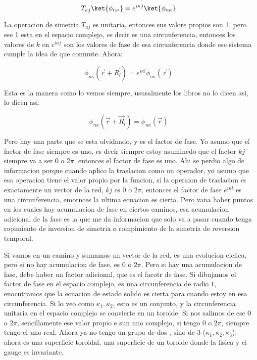 \documentclass[11pt,fleqn]{book}
\begin{document}
\begin{equation}
    T_{aj}\ket{\phi_{n\kappa}}=e^{i\kappa j}\ket{\phi_{n\kappa}   }
\end{equation}

La operacion de simetria $T_{aj}$ es unitaria, entonces sus valore propios son 1, pero ese 1 esta en el espacio complejo, es decir es una circunferencia, entonces los valores de $k$ en $e^{i\kappa j}$ son los valores de fase de esa circunferencia donde ese sistema cumple la idea de que conmute.  Ahora:

\begin{equation}
    \phi_{n\kappa}(\vec{r}+\vec{R}_{l})=e^{i\kappa l}\phi_{n\kappa}(\vec{r})   
\end{equation}

Esta es la manera como lo vemos siempre, ususalmente los libros no lo dicen asi, lo dicen asi:

\begin{equation*}
        \phi_{n\kappa}(\vec{r}+\vec{R}_{l})=\phi_{n\kappa}(\vec{r})   
\end{equation*}

Pero hay una parte que se esta olvidando, y es el factor de fase.  Yo asumo que el factor de fase siempre es uno, es decir siempre estoy asuminedo que el factor $kj$ siempre va a ser $0$ o $2\pi$, entonces el factor de fase es uno. Ahi se perdio algo de informacion porque cuando aplico la traslacion como un operador, yo asumo que esa operacion tiene el valor propio por la funcion, si la operaion de traslacion es exactamente un vector de la red, $kj$ es $0$ o $2\pi$, entonces el factor de fase $e^{i\kappa l}$ es una circunferencia, emotnces la ultima ecuacion es cierta. Pero vana haber puntos en los cuales hay acumulacion de fase en ciertos caminos, esa acumulacion adicional de la fase es la que me da informacion que solo va a pasar cuando tenga ropimiento de inversion de simetria o rompimiento de la simetria de reversion temporal.

Si vamos en un camino y sumamos un vector de la red, es una evolucion ciclica, pero si no hay acumulacion de fase, es $0$ o $2\pi$. Pero si hay una acumulacion de fase, debe haber un factor adicional, que es el facotr de fase. Si dibujamos el factor de fase en el espacio complejo, es una circunferencia de radio $1$, enocntramos que la ecuacion de estado solido es cierta para cuando estoy en esa circunferencia. Si lo veo como $\kappa_{1},\kappa_{2}$, esto es un conjunto, y la circunferencia unitaria en el espacio complejo se convierte en un toroide. Si nos salimos de ese $0$ o $2\pi$, sencillamente ese valor propio e sun uno complejo, si tengo $0$ o $2\pi$, siempre tengo el uno real. Ahora ya no tengo un grupo de dos , sino de 3 ($\kappa_{1},\kappa_{2},\kappa_{3}$), ahora es una superficie toroidal, una superficie de un toroide donde la fisica y el gauge es invariante. 
\end{document}
